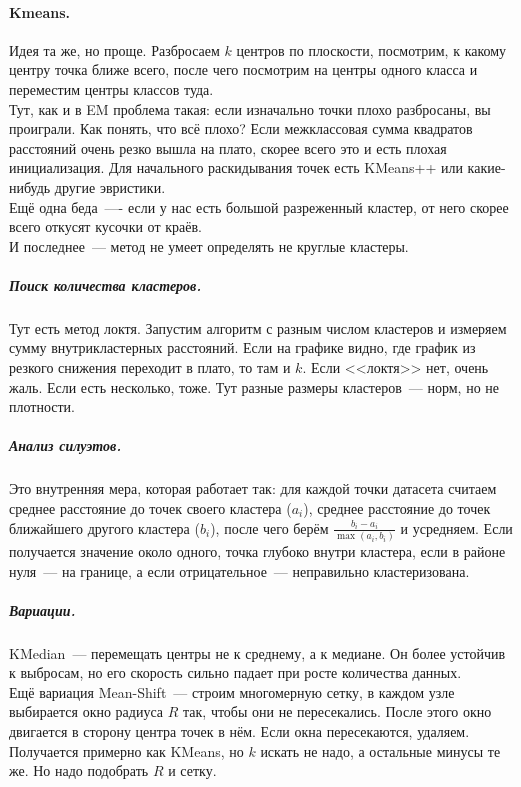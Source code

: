 \documentclass{article}
\begin{document}
    \paragraph{Kmeans.}
    Идея та же, но проще. Разбросаем $k$ центров по плоскости, посмотрим, к какому центру точка ближе всего, после чего посмотрим на центры одного класса и переместим центры классов туда.\\
    Тут, как и в EM проблема такая: если изначально точки плохо разбросаны, вы проиграли. Как понять, что всё плохо? Если межклассовая сумма квадратов расстояний очень резко вышла на плато, скорее всего это и есть плохая инициализация. Для начального раскидывания точек есть KMeans++ или какие-нибудь другие эвристики.\\
    Ещё одна беда~---- если у нас есть большой разреженный кластер, от него скорее всего откусят кусочки от краёв.\\
    И последнее~--- метод не умеет определять не круглые кластеры.
    \subparagraph{Поиск количества кластеров.}
    Тут есть метод локтя. Запустим алгоритм с разным числом кластеров и измеряем сумму внутрикластерных расстояний. Если на графике видно, где график из резкого снижения переходит в плато, то там и $k$. Если <<локтя>> нет, очень жаль. Если есть несколько, тоже. Тут разные размеры кластеров~--- норм, но не плотности.
    \subparagraph{Анализ силуэтов.}
    Это внутренняя мера, которая работает так: для каждой точки датасета считаем среднее расстояние до точек своего кластера ($a_i$), среднее расстояние до точек ближайшего другого кластера ($b_i$), после чего берём $\frac{b_i-a_i}{\max(a_i,b_i)}$ и усредняем. Если получается значение около одного, точка глубоко внутри кластера, если в районе нуля~--- на границе, а если отрицательное~--- неправильно кластеризована.
    \subparagraph{Вариации.}
    KMedian~--- перемещать центры не к среднему, а к медиане. Он более устойчив к выбросам, но его скорость сильно падает при росте количества данных.\\
    Ещё вариация Mean-Shift~--- строим многомерную сетку, в каждом узле выбирается окно радиуса $R$ так, чтобы они не пересекались. После этого окно двигается в сторону центра точек в нём. Если окна пересекаются, удаляем. Получается примерно как KMeans, но $k$ искать не надо, а остальные минусы те же. Но надо подобрать $R$ и сетку.
\end{document}

